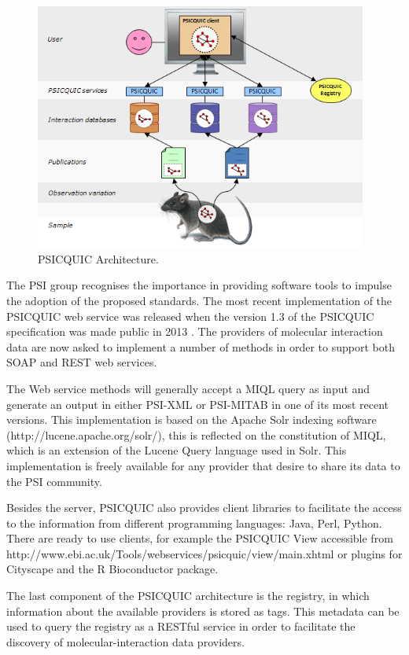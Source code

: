 \begin{figure}  
\centering
\includegraphics[width=4.3in]{figures/psicquic.png}
\caption[PSICQUIC Architecture.]{PSICQUIC Architecture.
\label{fig:psicquic}}
\end{figure}

The PSI group recognises the importance in providing software tools to impulse the adoption of the proposed standards. The most recent implementation of the PSICQUIC web service was released when the version 1.3 of the PSICQUIC specification was made public in 2013 \cite{DEL2013}. The providers of molecular interaction data are now asked to implement a number of methods in order to support both SOAP and REST web services. 

The Web service methods will generally accept a MIQL query as input and generate an output in either PSI-XML or PSI-MITAB in one of its most recent versions. This implementation is based on the Apache Solr indexing software (http://lucene.apache.org/solr/), this is reflected on the constitution of MIQL, which is an extension of the Lucene Query language used in Solr. This implementation is freely available for any provider that desire to share its data to the PSI community.

Besides the server, PSICQUIC also provides client libraries to facilitate the access to the information from different programming languages: Java, Perl, Python. There are ready to use clients, for example the PSICQUIC View accessible from http://www.ebi.ac.uk/Tools/webservices/psicquic/view/main.xhtml or plugins for Cityscape and the R Bioconductor package.

The last component of the PSICQUIC architecture is the registry, in which information about the available providers is stored as tags. This metadata can be used to query the registry as a RESTful service in order to facilitate the discovery of molecular-interaction data providers.

